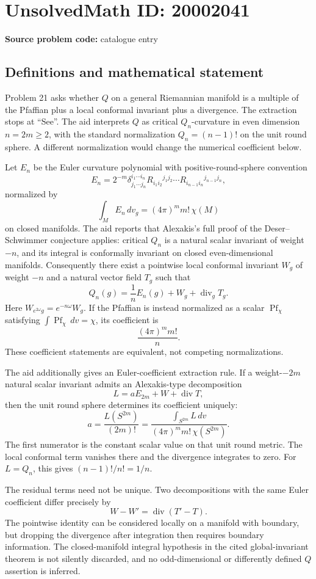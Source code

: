 \documentclass[11pt]{article}
\begin{document}
\section*{UnsolvedMath ID: 20002041}
\textbf{Source problem code:} catalogue entry
\subsection{Definitions and mathematical statement}
Problem 21 asks whether \(Q\) on a general Riemannian manifold is a multiple of the Pfaffian plus a local conformal invariant plus a divergence. The extraction stops at ``See''. The aid interprets \(Q\) as critical \(Q_n\)-curvature in even dimension \(n=2m\geq2\), with the standard normalization \(Q_n=(n-1)!\) on the unit round sphere. A different normalization would change the numerical coefficient below.

Let \(E_n\) be the Euler curvature polynomial with positive-round-sphere convention
\[
 E_n=2^{-m}\delta^{i_1\cdots i_n}_{j_1\cdots j_n}
 R_{i_1i_2}{}^{j_1j_2}\cdots
 R_{i_{n-1}i_n}{}^{j_{n-1}j_n},
\]
normalized by
\[
 \int_M E_n\,dv_g=(4\pi)^m m!\,\chi(M)
\]
on closed manifolds. The aid reports that Alexakis's full proof of the Deser--Schwimmer conjecture applies: critical \(Q_n\) is a natural scalar invariant of weight \(-n\), and its integral is conformally invariant on closed even-dimensional manifolds. Consequently there exist a pointwise local conformal invariant \(W_g\) of weight \(-n\) and a natural vector field \(T_g\) such that
\[
 Q_n(g)=\frac1nE_n(g)+W_g+\operatorname{div}_gT_g.
\]
Here \(W_{e^{2\omega}g}=e^{-n\omega}W_g\). If the Pfaffian is instead normalized as a scalar \(\operatorname{Pf}_\chi\) satisfying \(\int\operatorname{Pf}_\chi\,dv=\chi\), its coefficient is
\[
 \frac{(4\pi)^m m!}{n}.
\]
These coefficient statements are equivalent, not competing normalizations.

The aid additionally gives an Euler-coefficient extraction rule. If a weight-\(-2m\) natural scalar invariant admits an Alexakis-type decomposition
\[
 L=aE_{2m}+W+\operatorname{div}T,
\]
then the unit round sphere determines its coefficient uniquely:
\[
 a=\frac{L(S^{2m})}{(2m)!}
 =\frac{\int_{S^{2m}}L\,dv}
        {(4\pi)^m m!\,\chi(S^{2m})}.
\]
The first numerator is the constant scalar value on that unit round metric. The local conformal term vanishes there and the divergence integrates to zero. For \(L=Q_n\), this gives \((n-1)!/n!=1/n\).

The residual terms need not be unique. Two decompositions with the same Euler coefficient differ precisely by
\[
 W-W'=\operatorname{div}(T'-T).
\]
The pointwise identity can be considered locally on a manifold with boundary, but dropping the divergence after integration then requires boundary information. The closed-manifold integral hypothesis in the cited global-invariant theorem is not silently discarded, and no odd-dimensional or differently defined \(Q\) assertion is inferred.
\end{document}
